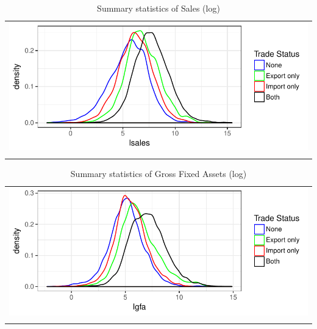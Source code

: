 \documentclass[12pt]{article}
\begin{document}
\begin{center}
\begin{table}[H]
\caption{Summary statistics of Sales (log)}
\label{lsales}
\begin{tabular}{c}
 \includegraphics{./PICS/denslsales.pdf}   \\ 
   \\  
\end{tabular}
\end{table}
\end{center}
\begin{center}
\begin{table}[H]
\caption{Summary statistics of Gross Fixed Assets (log)}
\label{lgfa}
\begin{tabular}{c}
 \includegraphics{./PICS/denslgfa.pdf}   \\ 
   \\  
\end{tabular}
\end{table}
\end{center}
\end{document}
